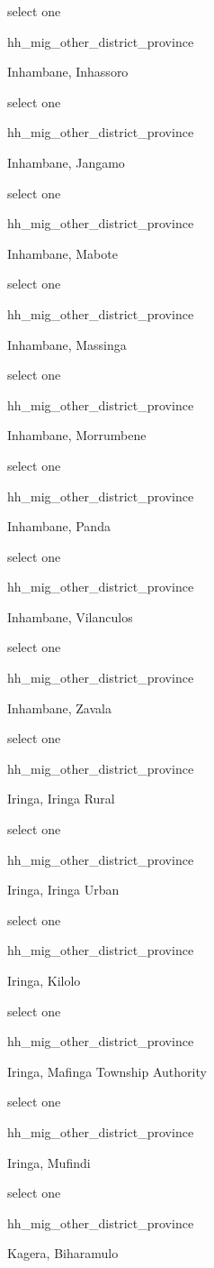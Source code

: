\documentclass[]{article}
\begin{document}
select one

hh\_mig\_other\_district\_province

Inhambane, Inhassoro

select one

hh\_mig\_other\_district\_province

Inhambane, Jangamo

select one

hh\_mig\_other\_district\_province

Inhambane, Mabote

select one

hh\_mig\_other\_district\_province

Inhambane, Massinga

select one

hh\_mig\_other\_district\_province

Inhambane, Morrumbene

select one

hh\_mig\_other\_district\_province

Inhambane, Panda

select one

hh\_mig\_other\_district\_province

Inhambane, Vilanculos

select one

hh\_mig\_other\_district\_province

Inhambane, Zavala

select one

hh\_mig\_other\_district\_province

Iringa, Iringa Rural

select one

hh\_mig\_other\_district\_province

Iringa, Iringa Urban

select one

hh\_mig\_other\_district\_province

Iringa, Kilolo

select one

hh\_mig\_other\_district\_province

Iringa, Mafinga Township Authority

select one

hh\_mig\_other\_district\_province

Iringa, Mufindi

select one

hh\_mig\_other\_district\_province

Kagera, Biharamulo
\end{document}
